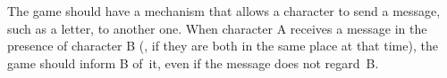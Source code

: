 The game should have a mechanism that allows a character to send a message,
such as a letter, to another one.
When character A receives a message in the presence of character B
(\ie, if they are both in the same place at that time), the game
should inform B of~it, even if the message does not regard~B\@.
